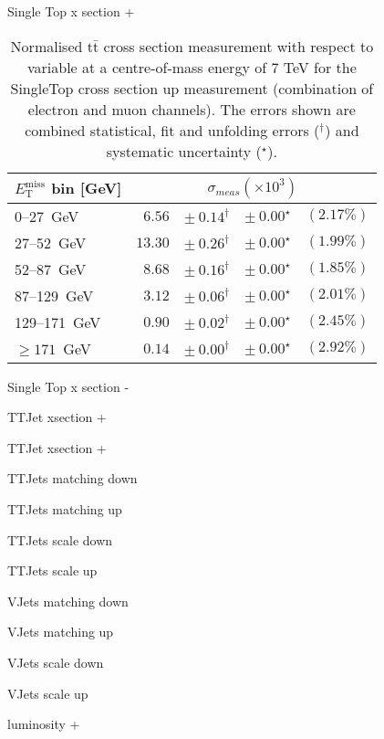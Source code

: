 \documentclass{article}
\newcommand{\ttbar}{\ensuremath{\text{t}\bar{\text{t}}}\xspace}
\newcommand{\GeV}{GeV}
\begin{document}
Single Top x section +
\begin{table}[htbp]
\setlength{\tabcolsep}{2pt}
\centering
\caption{Normalised \ttbar cross section measurement with respect to \MET variable
at a centre-of-mass energy of 7 TeV for the SingleTop cross section up measurement (combination of
electron and muon channels). The errors shown are combined statistical, fit and unfolding errors ($^\dagger$) and systematic uncertainty ($^\star$).}
\label{tab:MET_xsections_7TeV_Single_Top_cross_section_up_combined}
\begin{tabular}{lrrrr}
\hline
$E_{\mathrm{T}}^{\mathrm{miss}}$ bin [\GeV] & \multicolumn{4}{c}{$\sigma_{meas} \left(\times 10^{3}\right)$}\\ 
\hline
0--27~\GeV &  $6.56$ & $ \pm~ 0.14^\dagger$ & $ \pm~ 0.00^\star$ & $(2.17\%)$\\ 
27--52~\GeV &  $13.30$ & $ \pm~ 0.26^\dagger$ & $ \pm~ 0.00^\star$ & $(1.99\%)$\\ 
52--87~\GeV &  $8.68$ & $ \pm~ 0.16^\dagger$ & $ \pm~ 0.00^\star$ & $(1.85\%)$\\ 
87--129~\GeV &  $3.12$ & $ \pm~ 0.06^\dagger$ & $ \pm~ 0.00^\star$ & $(2.01\%)$\\ 
129--171~\GeV &  $0.90$ & $ \pm~ 0.02^\dagger$ & $ \pm~ 0.00^\star$ & $(2.45\%)$\\ 
$\geq 171$~\GeV &  $0.14$ & $ \pm~ 0.00^\dagger$ & $ \pm~ 0.00^\star$ & $(2.92\%)$\\ 
\hline 
\end{tabular}
\end{table}


Single Top x section -


TTJet xsection +


TTJet xsection +


TTJets matching down


TTJets matching up

TTJets scale down

TTJets scale up

VJets matching down

VJets matching up

VJets scale down

VJets scale up

luminosity +
\end{document}
